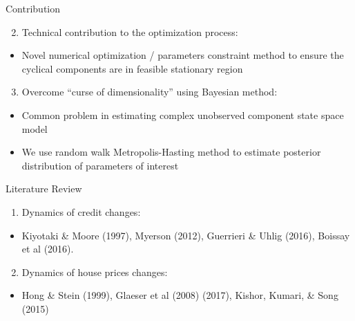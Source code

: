 \documentclass[
  ignorenonframetext,
]{beamer}
\providecommand{\tightlist}{%
  \setlength{\itemsep}{0pt}\setlength{\parskip}{0pt}}
\begin{document}
\begin{frame}{Contribution}
\protect\hypertarget{contribution-1}{}
\begin{enumerate}
\setcounter{enumi}{1}
\tightlist
\item
  Technical contribution to the optimization process:
\end{enumerate}

\begin{itemize}
\tightlist
\item
  Novel numerical optimization / parameters constraint method to ensure
  the cyclical components are in feasible stationary region
\end{itemize}

\begin{enumerate}
\setcounter{enumi}{2}
\tightlist
\item
  Overcome ``curse of dimensionality'' using Bayesian method:
\end{enumerate}

\begin{itemize}
\tightlist
\item
  Common problem in estimating complex unobserved component state space
  model
\item
  We use random walk Metropolis-Hasting method to estimate posterior
  distribution of parameters of interest
\end{itemize}
\end{frame}

\begin{frame}{Literature Review}
\protect\hypertarget{literature-review}{}
\begin{enumerate}
\tightlist
\item
  Dynamics of credit changes:
\end{enumerate}

\begin{itemize}
\tightlist
\item
  Kiyotaki \& Moore (1997), Myerson (2012), Guerrieri \& Uhlig (2016),
  Boissay et al (2016).
\end{itemize}

\begin{enumerate}
\setcounter{enumi}{1}
\tightlist
\item
  Dynamics of house prices changes:
\end{enumerate}

\begin{itemize}
\tightlist
\item
  Hong \& Stein (1999), Glaeser et al (2008) (2017), Kishor, Kumari, \&
  Song (2015)
\end{itemize}
\end{frame}
\end{document}
